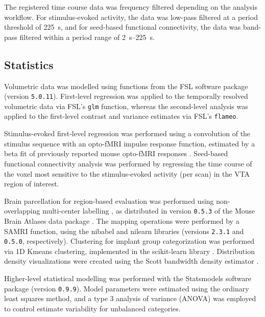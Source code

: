 The registered time course data was frequency filtered depending on the analysis workflow.
For stimulus-evoked activity, the data was low-pass filtered at a period threshold of \SI{225}{\second}, and for seed-based functional connectivity, the data was band-pass filtered within a period range of \SIrange{2}{225}{\second}.

\subsection{Statistics}
Volumetric data was modelled using functions from the FSL software package \cite{fsl} (version \textcolor{mg}{\texttt{5.0.11}}).
First-level regression was applied to the temporally resolved volumetric data via FSL's \textcolor{mg}{\texttt{glm}} function, whereas the second-level analysis was applied to the first-level contrast and variance estimates via FSL's \textcolor{mg}{\texttt{flameo}}.

Stimulus-evoked first-level regression was performed using a convolution of the stimulus sequence with an opto-fMRI impulse response function, estimated by a beta fit of previously reported mouse opto-fMRI responses \cite{Grandjean2019}.
Seed-based functional connectivity analysis was performed by regressing the time course of the voxel most sensitive to the stimulus-evoked activity (per scan) in the VTA region of interest.

Brain parcellation for region-based evaluation was performed using non-overlapping multi-center labelling \cite{dsu1,dsu2,dsu3,dsu4}, as distributed in version \textcolor{mg}{\texttt{0.5.3}} of the Mouse Brain Atlases data package \cite{atlases_generator}.
The mapping operations were performed by a SAMRI function, using the nibabel \cite{nibabel} and nilearn \cite{nilearn} libraries (versions \textcolor{mg}{\texttt{2.3.1}} and \textcolor{mg}{\texttt{0.5.0}}, respectively).
Clustering for implant group categorization was performed via 1D Kmeans clustering, implemented in the scikit-learn library \cite{scikit-learn}.
Distribution density visualizations were created using the Scott bandwidth density estimator \cite{Scott1979}.

Higher-level statistical modelling was performed with the Statsmodels software package \cite{statsmodels} (version \textcolor{mg}{\texttt{0.9.9}}).
Model parameters were estimated using the ordinary least squares method, and a type 3 analysis of variance (ANOVA) was employed to control estimate variability for unbalanced categories.


